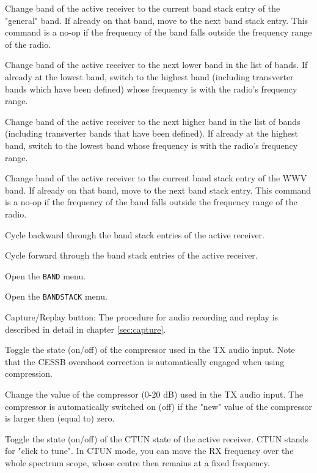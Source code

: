 \documentclass[12pt]{book}
\begin{document}
{Change band of the active receiver to the current band stack entry of the "general" band. If already on that
band, move to
the next band stack entry. This command is a no-op if the frequency of the band falls outside the frequency
range of the radio.}

{Change band of the active receiver to the next lower band in the list of bands. If already at the lowest
band, switch to the highest band (including transverter bands which have been defined) whose frequency is
with the radio's frequency range.}

{Change band of the active receiver to the next higher band in the list of bands (including transverter
bands that have been defined). If already at the highest band, switch to the lowest band whose frequency is
with the radio's frequency range.}

{Change band of the active receiver to the current band stack entry of the WWV band. If already on that band,
move to the next band stack entry. This command is a no-op if the frequency of the band falls outside the
frequency range of the radio.}

{Cycle backward through the band stack entries of the active receiver.}

{Cycle forward through the band stack entries of the active receiver.}

{Open the \texttt{BAND} menu.}

{Open the \texttt{BANDSTACK} menu.}

{Capture/Replay button: The procedure for audio recording and replay is described
in detail in chapter \ref{sec:capture}.}

{Toggle the state (on/off) of the compressor used in the TX audio input. Note that the CESSB overshoot
correction is automatically engaged when using compression.}

{Change the value of the compressor (0-20 dB) used in the TX audio input. The compressor is automatically
switched on (off) if the "new" value of the compressor is larger then  (equal to) zero.}

{Toggle the state (on/off) of the CTUN state of the active receiver. CTUN stands for "click to tune". In
CTUN mode, you can move
the RX frequency over the whole spectrum scope, whose centre then remains at a fixed frequency.}
\end{document}
